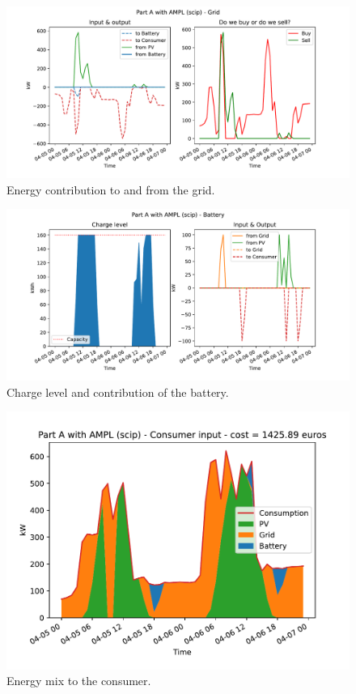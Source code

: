 \documentclass[12pt]{article}
\begin{document}
\begin{figure}[p]
    \centering
    \includegraphics[width=\textwidth]{PartA/grid}
    \caption{Energy contribution to and from the grid.}
\end{figure}

\begin{figure}[p]
    \centering
    \includegraphics[width=\textwidth]{PartA/battery}
    \caption{Charge level and contribution of the battery.}
    \label{fig:batteryA}
\end{figure}

\begin{figure}[p]
    \centering
    \includegraphics[width=\textwidth]{PartA/consumer_input}
    \caption{Energy mix to the consumer.}
    \label{fig:solA}
\end{figure}
\end{document}
